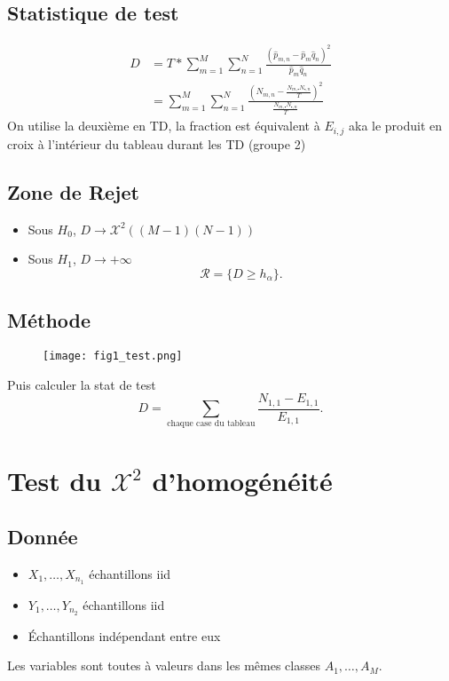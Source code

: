 \documentclass{article}
\theoremstyle{plain}%
\theoremstyle{definition}
\theoremstyle{remark}
\begin{document}
\subsection*{Statistique de test}
    \begin{align*}
        D &= T * \sum_{m=1}^{M}\sum_{n=1}^{N}\frac{(\hat{p}_{m,n} - \hat{p}_m \hat{q}_n)^2}{\hat{p}_m \hat{q}_n} \\
            &= \sum_{m=1}^{M}\sum_{n=1}^{N}\frac{( N_{m,n} - \frac{N_{m, \centerdot} N_{\centerdot, n}}{T})^2}{\frac{N_{m, \centerdot} N_{\centerdot, n}}{T}}
    \end{align*}
    On utilise la deuxième en TD, la fraction est équivalent à $ E_{i,j} $ aka le produit en croix à l'intérieur du tableau durant les TD (groupe 2)

\subsection*{Zone de Rejet}
\begin{itemize}
    \item Sous $ H_0 $, $ D \to \mathcal{X}^2 ((M-1)(N-1))  $
    \item Sous $ H_1 $, $ D \to +\infty  $
    \[
        \mathcal{R} = \{D \geq h_\alpha \}
    .\]
\end{itemize}

\subsection*{Méthode}
\begin{figure}[!h]
    \centering
    \texttt{[image: fig1\_test.png]}
\end{figure}
Puis calculer la stat de test 
\[
    D = \sum_{\text{chaque case du tableau}}\frac{N_{1,1}- E_{1,1}}{E_{1,1}}
.\]


\section{Test du $ \mathcal{X}^2 $ d'homogénéité}
\subsection*{Donnée}
\begin{itemize}
    \item $ X_1, \dots, X_{n_1} $ échantillons iid
    \item $ Y_1, \dots, Y_{n_2} $ échantillons iid
    \item Échantillons indépendant entre eux
\end{itemize}
Les variables sont toutes à valeurs dans les mêmes classes $ A_1, \dots, A_M $.
\end{document}

